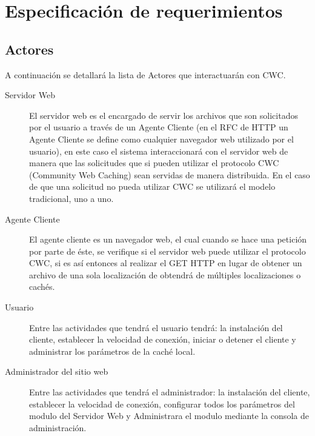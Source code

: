 
\chapter{Especificación de requerimientos} %

\label{ch:especificacion_requerimientos} %


\section{Actores}

A continuación se detallará la lista de Actores que interactuarán con CWC. 

\begin{description}
\item[Servidor Web] El servidor web es el encargado de servir los archivos que son solicitados por el usuario a través de un Agente Cliente (en el RFC de HTTP \cite{rfc2616} un Agente Cliente se define como cualquier navegador web utilizado por el usuario), en este caso el sistema interaccionará con el servidor web de manera que las solicitudes que si pueden utilizar el protocolo CWC (Community Web Caching) sean servidas de manera distribuida. En el caso de que una solicitud no pueda utilizar CWC se utilizará el modelo tradicional, uno a uno.
\item[Agente Cliente] El agente cliente es un navegador web, el cual cuando se hace una petición por parte de éste, se verifique si el servidor web puede utilizar el protocolo CWC, si es así entonces al realizar el GET HTTP en lugar de obtener un archivo de una sola localización de obtendrá de múltiples localizaciones o cachés.
\item[Usuario] Entre las actividades que tendrá el usuario tendrá: la instalación del cliente, establecer la velocidad de conexión, iniciar o detener el cliente y administrar los parámetros de la caché local. 
\item[Administrador del sitio web] Entre las actividades que tendrá el administrador: la instalación del cliente, establecer la velocidad de conexión, configurar todos los parámetros del modulo del Servidor Web y Administrara el modulo mediante la consola de administración.
\end{description}

